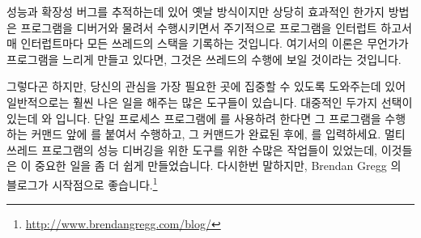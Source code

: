 성능과 확장성 버그를 추적하는데 있어 옛날 방식이지만 상당히 효과적인 한가지
방법은 프로그램을 디버거와 물려서 수행시키면서 주기적으로 프로그램을 인터럽트
하고서 매 인터럽트마다 모든 쓰레드의 스택을 기록하는 것입니다.
여기서의 이론은 무언가가 프로그램을 느리게 만들고 있다면, 그것은 쓰레드의
수행에 보일 것이라는 것입니다.

그렇다곤 하지만, 당신의 관심을 가장 필요한 곳에 집중할 수 있도록 도와주는데
있어 일반적으로는 훨씬 나은 일을 해주는 많은 도구들이 있습니다.
대중적인 두가지 선택이 있는데  와  입니다.
단일 프로세스 프로그램에  를 사용하려 한다면 그 프로그램을 수행하는
커맨드 앞에  를 붙여서 수행하고, 그 커맨드가 완료된 후에,
 를 입력하세요.
멀티 쓰레드 프로그램의 성능 디버깅을 위한 도구를 위한 수많은 작업들이 있었는데,
이것들은 이 중요한 일을 좀 더 쉽게 만들었습니다.
다시한번 말하지만, Brendan Gregg 의 블로그가 시작점으로 좋습니다.\footnote{
	\url{http://www.brendangregg.com/blog/}}

